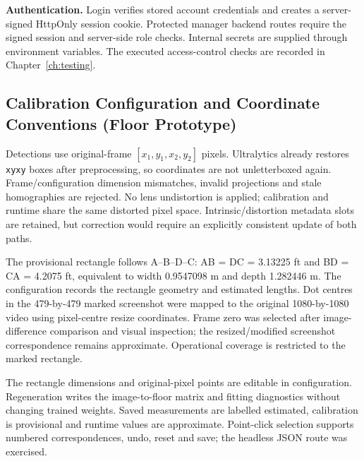 \textbf{Authentication.} Login verifies stored account credentials and creates a server-signed HttpOnly session cookie. Protected manager backend routes require the signed session and server-side role checks. Internal secrets are supplied through environment variables. The executed access-control checks are recorded in Chapter~\ref{ch:testing}.

\subsection{Calibration Configuration and Coordinate Conventions (Floor Prototype)}
Detections use original-frame $[x_1,y_1,x_2,y_2]$ pixels. Ultralytics already restores \texttt{xyxy} boxes after preprocessing, so coordinates are not unletterboxed again. Frame/configuration dimension mismatches, invalid projections and stale homographies are rejected. No lens undistortion is applied; calibration and runtime share the same distorted pixel space. Intrinsic/distortion metadata slots are retained, but correction would require an explicitly consistent update of both paths.

The provisional rectangle follows A--B--D--C: AB = DC = 3.13225 ft and BD = CA = 4.2075 ft, equivalent to width 0.9547098 m and depth 1.282446 m. The configuration records the rectangle geometry and estimated lengths. Dot centres in the 479-by-479 marked screenshot were mapped to the original 1080-by-1080 video using pixel-centre resize coordinates. Frame zero was selected after image-difference comparison and visual inspection; the resized/modified screenshot correspondence remains approximate. Operational coverage is restricted to the marked rectangle.

The rectangle dimensions and original-pixel points are editable in configuration. Regeneration writes the image-to-floor matrix and fitting diagnostics without changing trained weights. Saved measurements are labelled estimated, calibration is provisional and runtime values are approximate. Point-click selection supports numbered correspondences, undo, reset and save; the headless JSON route was exercised.

